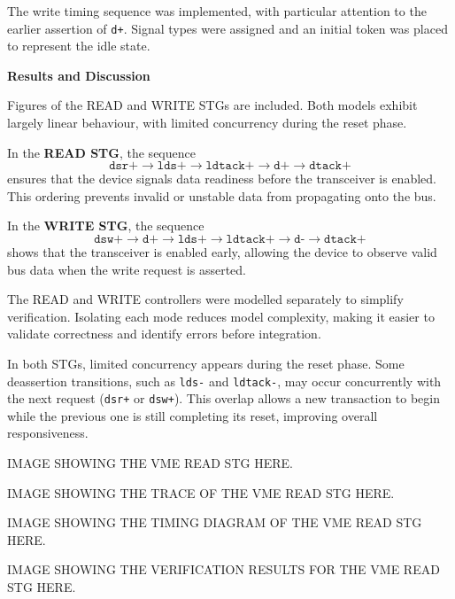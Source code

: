 \documentclass[a4paper,12pt]{article}
\begin{document}
The write timing sequence was implemented, with particular attention to the earlier assertion of \texttt{d+}. Signal types were assigned and an initial token was placed to represent the idle state.

\textbf{Results and Discussion}

Figures of the READ and WRITE STGs are included. Both models exhibit largely linear behaviour, with limited concurrency during the reset phase.

In the \textbf{READ STG}, the sequence
\[
\texttt{dsr+} \rightarrow \texttt{lds+} \rightarrow \texttt{ldtack+} \rightarrow \texttt{d+} \rightarrow \texttt{dtack+}
\]
ensures that the device signals data readiness before the transceiver is enabled. This ordering prevents invalid or unstable data from propagating onto the bus.

In the \textbf{WRITE STG}, the sequence
\[
\texttt{dsw+} \rightarrow \texttt{d+} \rightarrow \texttt{lds+} \rightarrow \texttt{ldtack+} \rightarrow \texttt{d-} \rightarrow \texttt{dtack+}
\]
shows that the transceiver is enabled early, allowing the device to observe valid bus data when the write request is asserted.

The READ and WRITE controllers were modelled separately to simplify verification. Isolating each mode reduces model complexity, making it easier to validate correctness and identify errors before integration.

In both STGs, limited concurrency appears during the reset phase. Some deassertion transitions, such as \texttt{lds-} and \texttt{ldtack-}, may occur concurrently with the next request (\texttt{dsr+} or \texttt{dsw+}). This overlap allows a new transaction to begin while the previous one is still completing its reset, improving overall responsiveness.

\begin{large}
    IMAGE SHOWING THE VME READ STG HERE.
\end{large}

\begin{large}
    IMAGE SHOWING THE TRACE OF THE VME READ STG HERE.
\end{large}

\begin{large}
    IMAGE SHOWING THE TIMING DIAGRAM OF THE VME READ STG HERE.
\end{large}

\begin{large}
    IMAGE SHOWING THE VERIFICATION RESULTS FOR THE VME READ STG HERE.
\end{large}
\end{document}
